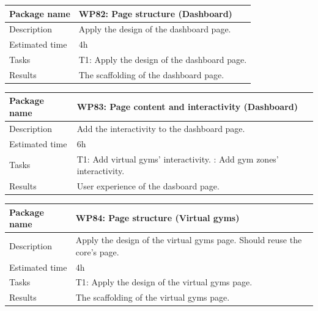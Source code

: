 \documentclass[a4paper, 12pt, oneside]{book}
\begin{document}
\vspace*{16pt}
\begin{tabularx}{\textwidth}{| l | X |}
	\hline
	\rowcolor{rowColor}
	{\semibf Package name}   & {\semibf WP82}: Page structure (Dashboard)            \\
	\hline
	{\semibf Description}    & Apply the design of the dashboard page.               \\
	\hline
	\rowcolor{rowColor}
	{\semibf Estimated time} & 4h                                                    \\
	\hline
	{\semibf Tasks}          & {\semibf T1}: Apply the design of the dashboard page. \\
	\hline
	\rowcolor{rowColor}
	{\semibf Results}        & The scaffolding of the dashboard page.                \\
	\hline
\end{tabularx}
\vspace*{16pt}
\begin{tabularx}{\textwidth}{| l | X |}
	\hline
	\rowcolor{rowColor}
	{\semibf Package name}   & {\semibf WP83}: Page content and interactivity (Dashboard) \\
	\hline
	{\semibf Description}    & Add the interactivity to the dashboard page.               \\
	\hline
	\rowcolor{rowColor}
	{\semibf Estimated time} & 6h                                                         \\
	\hline
	{\semibf Tasks}          & {\semibf T1}: Add virtual gyms' interactivity.
	\newline {\semibf T2}: Add gym zones' interactivity.                                  \\
	\hline
	\rowcolor{rowColor}
	{\semibf Results}        & User experience of the dasboard page.                      \\
	\hline
\end{tabularx}
\vspace*{16pt}
\begin{tabularx}{\textwidth}{| l | X |}
	\hline
	\rowcolor{rowColor}
	{\semibf Package name}   & {\semibf WP84}: Page structure (Virtual gyms)                            \\
	\hline
	{\semibf Description}    & Apply the design of the virtual gyms page. Should reuse the core's page. \\
	\hline
	\rowcolor{rowColor}
	{\semibf Estimated time} & 4h                                                                       \\
	\hline
	{\semibf Tasks}          & {\semibf T1}: Apply the design of the virtual gyms page.                 \\
	\hline
	\rowcolor{rowColor}
	{\semibf Results}        & The scaffolding of the virtual gyms page.                                \\
	\hline
\end{tabularx}
\end{document}
